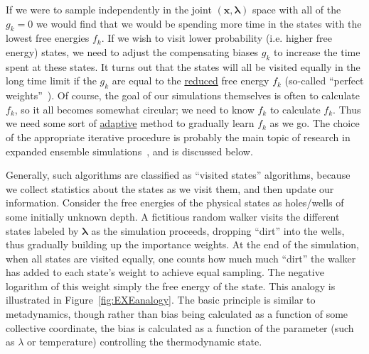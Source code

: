 \documentclass[9pt,review]{livecoms}
\newcommand{\vx}{\mathbf{x}}
\begin{document}
If we were to sample independently in the joint $(\vx,\mathbf{\lambda})$ space with all of the $g_k=0$
we would find that we would be spending more time in the states with the lowest free energies $f_k$.  If we wish to visit
  lower probability (i.e. higher free energy) states, we need to adjust the compensating biases $g_k$ to increase the time spent at these states. It turns out that the states will all be visited equally in the long time limit if the $g_k$ are equal to the \hyperlink{ref:reduced} {reduced} free
    energy $f_k$ (so-called ``perfect weights''~\cite{park-pande:pre:2007:choosing-weights-simulated-tempering}).
    Of course, the goal of our simulations
    themselves is often to calculate $f_k$, so it all
    becomes somewhat circular; we need to know $f_k$ to calculate $f_k$.
    Thus we need some sort of \hyperlink{ref:Adaptive} {adaptive} method to gradually learn $f_k$
    as we go. The choice of the appropriate iterative procedure is probably the main topic of research in expanded ensemble simulations~\cite{lyubartsev:jcp:1992:expanded-ensembles,marinari-parisi:europhys-lett:1992:simulated-tempering,wang-landau:prl:2001:wang-landau,park-ensign-pande:pre:2006:bayesian-weight-update,park-pande:pre:2007:choosing-weights-simulated-tempering,li-fajer-yang:jcp:2007:simulated-scaling,chelli:jctc:2010:optimal-weights-expanded-ensembles}, and is discussed below.

Generally, such algorithms are classified as ``visited states''
algorithms, because we collect statistics about the states as we visit
them, and then update our information. Consider the free energies of
the physical states as holes/wells of some initially unknown depth.  A
fictitious random walker visits the different states labeled by
$\mathbf{\lambda}$ as the simulation proceeds, dropping ``dirt'' into the
wells, thus gradually building up the importance weights.  At the end
of the simulation, when all states are visited equally, one counts how
much much ``dirt'' the walker has added to each state's weight to
achieve equal sampling. The negative logarithm of this weight simply
the free energy of the state.  This analogy is illustrated in
Figure~\ref{fig:EXEanalogy}. The basic principle is similar to metadynamics, though rather than bias being calculated as a function of some collective coordinate, the bias is calculated as a function of the parameter (such as $\lambda$ or temperature) controlling the thermodynamic state.
\end{document}
